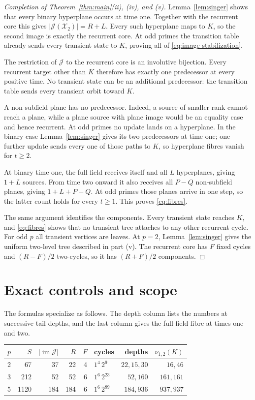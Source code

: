 \documentclass[a4paper,10pt]{amsart}
\theoremstyle{remark}
\newcommand{\K}{K}
\newcommand{\X}{\mathcal X}
\newcommand{\J}{\mathcal J}
\newcommand{\im}{\operatorname{im}}
\begin{document}
\begin{proof}[Completion of Theorem~\ref{thm:main}(ii), (iv), and (v)]
Lemma~\ref{lem:singer} shows that every binary hyperplane occurs at time one.
Together with the recurrent core this gives $|\J(\X_2)|=R+L$.  Every such
hyperplane maps to $\K$, so the second image is exactly the recurrent core.
At odd primes the transition table already sends every transient state to
$\K$, proving all of \eqref{eq:image-stabilization}.

The restriction of $\J$ to the recurrent core is an involutive bijection.
Every recurrent target other than $\K$ therefore has exactly one predecessor
at every positive time.  No transient state can be an additional predecessor:
the transition table sends every transient orbit toward $\K$.

A non-subfield plane has no predecessor.  Indeed, a source of smaller rank
cannot reach a plane, while a plane source with plane image would be an
equality case and hence recurrent.  At odd primes no update lands on a
hyperplane.  In the binary case Lemma~\ref{lem:singer} gives its two
predecessors at time one; one further update sends every one of those paths
to $\K$, so hyperplane fibres vanish for $t\geq2$.

At binary time one, the full field receives itself and all $L$ hyperplanes,
giving $1+L$ sources.  From time two onward it also receives all $P-Q$
non-subfield planes, giving $1+L+P-Q$.  At odd primes those planes arrive in
one step, so the latter count holds for every $t\geq1$.  This proves
\eqref{eq:fibres}.

The same argument identifies the components.  Every transient state reaches
$\K$, and \eqref{eq:fibres} shows that no transient tree attaches to any
other recurrent cycle.  For odd $p$ all transient vertices are leaves.  At
$p=2$, Lemma~\ref{lem:singer} gives the uniform two-level tree described in
part (v).  The recurrent core has $F$ fixed cycles and $(R-F)/2$ two-cycles,
so it has $(R+F)/2$ components.
\end{proof}

\section{Exact controls and scope}

The formulas specialize as follows.  The depth column lists the numbers at
successive tail depths, and the last column gives the full-field fibre at
times one and two.

\begin{center}
\begin{tabular}{c@{\quad}rrrrlrr}
\toprule
$p$ & $S$ & $|\im\J|$ & $R$ & $F$ & cycles & depths & $\nu_{1,2}(\K)$\\
\midrule
2 & 67 & 37 & 22 & 4 & $1^4\,2^9$ & $22,15,30$ & $16,46$\\
3 & 212 & 52 & 52 & 6 & $1^6\,2^{23}$ & $52,160$ & $161,161$\\
5 & 1120 & 184 & 184 & 6 & $1^6\,2^{89}$ & $184,936$ & $937,937$\\
\bottomrule
\end{tabular}
\end{center}
\end{document}
